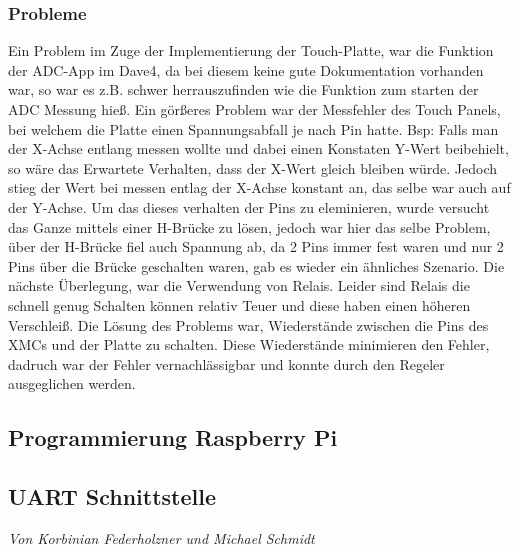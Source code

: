 \documentclass[12pt,a4paper,bibliography=totoc,listof=totoc]{scrartcl}
\begin{document}
\subsubsection{Probleme}
Ein Problem im Zuge der Implementierung der Touch-Platte, war die Funktion der ADC-App im Dave4, da bei diesem
keine gute Dokumentation vorhanden war, so war es z.B. schwer herrauszufinden wie die Funktion zum starten der ADC Messung 
hieß. Ein görßeres Problem war der Messfehler des Touch Panels, bei welchem die Platte einen Spannungsabfall je nach Pin hatte.
Bsp: Falls man der X-Achse entlang messen wollte und dabei einen Konstaten Y-Wert beibehielt, so wäre das Erwartete Verhalten,
dass der X-Wert gleich bleiben würde. Jedoch stieg der Wert bei messen entlag der X-Achse konstant an, das selbe war auch auf
der Y-Achse. Um das dieses verhalten der Pins zu eleminieren, wurde versucht das Ganze mittels einer H-Brücke zu lösen, 
jedoch war hier das selbe Problem, über der H-Brücke fiel auch Spannung ab, da 2 Pins immer fest waren und nur 2 Pins
über die Brücke geschalten waren, gab es wieder ein ähnliches Szenario. Die nächste Überlegung, war die Verwendung von Relais.
Leider sind Relais die schnell genug Schalten können relativ Teuer und diese haben einen höheren Verschleiß.
Die Lösung des Problems war, Wiederstände zwischen die Pins des XMCs und der Platte zu schalten. Diese Wiederstände 
minimieren den Fehler, dadruch war der Fehler vernachlässigbar und konnte durch den Regeler ausgeglichen werden. 

\subsection{Programmierung Raspberry Pi}

\subsection{UART Schnittstelle}
\textit{Von Korbinian Federholzner und Michael Schmidt}\newline
\end{document}
